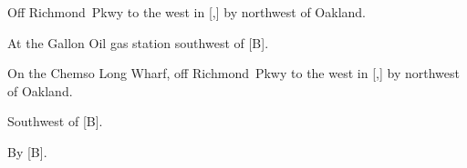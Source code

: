 
\begin{LocationList}

Off Richmond~Pkwy to the west in [,] by  northwest of Oakland.

At the Gallon Oil gas station southwest of  [B].

On the Chemso Long Wharf, off Richmond~Pkwy to the west in [,] by  northwest of Oakland.

Southwest of  [B].

\Location{\TruckService \Rest \Service}
By  [B].

\end{LocationList}
